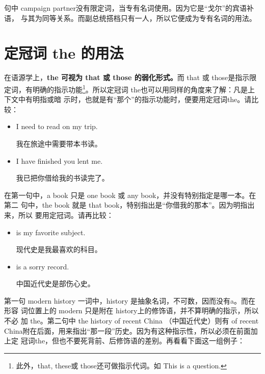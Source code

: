 句中 campaign partner没有限定词，当专有名词使用。因为它是“戈尔”的宾语补语，
与其为同等关系。而副总统搭档只有一人，所以它便成为专有名词的用法。

\section{定冠词 the 的用法}

在语源学上，\textbf{the 可视为 that 或 those 的弱化形式。}而 that 或 those是指示限
定词，有明确的指示功能\footnote{此外，that, these或 those还可做指示代词。如 This is a
  question. }。所以定冠词 the也可以用同样的角度来了解：凡是上下文中有明指或暗
示时，也就是有“那个”的指示功能时，便要用定冠词the。请比较：

\begin{itemize}
\item  I need  to read on my trip.

  我在旅途中需要带本书读。
\item  I have finished  you lent me.

  我已把你借给我的书读完了。
\end{itemize}

在第一句中，a book 只是 one book 或 any book，并没有特别指定是哪一本。在第二
句中，the book 就是 that book，特别指出是“你借我的那本”。因为明指出来，所以
要用定冠词。请再比较：

\begin{itemize}
\item  {} is my favorite subject.

  现代史是我最喜欢的科目。
\item  {} is a sorry record.

  中国近代史是部伤心史。
\end{itemize}

第一句 modern history 一词中，history 是抽象名词，不可数，因而没有a。而在形容
词位置上的 modern 只是附在 history上的修饰语，并不算明确的指示，所以不必
加 the。第二句中 the history of recent China （中国近代史）则有 of recent
China附在后面，用来指出“那一段”历史。因为有这种指示性，所以必须在前面加上定
冠词the，但也不要死背前、后修饰语的差别。再看看下面这一组例子：

